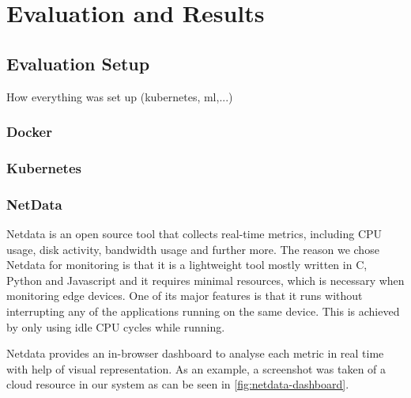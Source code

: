 \chapter{Evaluation and Results}

\section{Evaluation Setup}
  How everything was set up (kubernetes, ml,...)
  
  \subsection{Docker}
  \subsection{Kubernetes}
  \subsection{NetData}

    Netdata is an open source tool that collects real-time metrics, including CPU usage, disk activity, bandwidth usage and further more.
    The reason we chose Netdata for monitoring is that it is a lightweight tool mostly written in C, Python and Javascript and it requires minimal resources, which is necessary when monitoring edge devices.
    One of its major features is that it runs without interrupting any of the applications running on the same device. This is achieved by only using idle CPU cycles while running.

    Netdata provides an in-browser dashboard to analyse each metric in real time with help of visual representation. As an example, a screenshot was taken of a cloud resource in our system as can be seen in \ref{fig:netdata-dashboard}.

